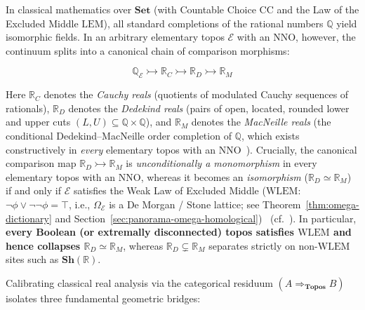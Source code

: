 \documentclass[10pt,twoside,openright]{book}
\theoremstyle{crmplain}
\theoremstyle{crmdef}
\theoremstyle{crmremark}
\begin{document}
In classical mathematics over $\mathbf{Set}$ (with Countable Choice $\mathrm{CC}$ and the Law of the Excluded Middle $\mathrm{LEM}$), all standard completions of the rational numbers $\mathbb{Q}$ yield isomorphic fields. In an arbitrary elementary topos $\mathcal{E}$ with an $\mathrm{NNO}$, however, the continuum splits into a canonical chain of comparison morphisms:

\[
  \mathbb{Q}_{\mathcal{E}} \rightarrowtail \mathbb{R}_C \rightarrowtail \mathbb{R}_D \rightarrowtail \mathbb{R}_M
\]

Here $\mathbb{R}_C$ denotes the \emph{Cauchy reals} (quotients of modulated Cauchy sequences of rationals), $\mathbb{R}_D$ denotes the \emph{Dedekind reals} (pairs of open, located, rounded lower and upper cuts $(L, U) \subseteq \mathbb{Q} \times \mathbb{Q}$), and $\mathbb{R}_M$ denotes the \emph{MacNeille reals} (the conditional Dedekind--MacNeille order completion of $\mathbb{Q}$, which exists constructively in \emph{every} elementary topos with an $\mathrm{NNO}$~\cite[\S D4.7, Thm.~D4.7.6]{Johnstone02}). Crucially, the canonical comparison map $\mathbb{R}_D \rightarrowtail \mathbb{R}_M$ is \emph{unconditionally a monomorphism} in every elementary topos with an $\mathrm{NNO}$, whereas it becomes an \emph{isomorphism} ($\mathbb{R}_D \simeq \mathbb{R}_M$) if and only if $\mathcal{E}$ satisfies the Weak Law of Excluded Middle ($\mathrm{WLEM}$: $\neg\phi \vee \neg\neg\phi = \top$, i.e., $\Omega_{\mathcal{E}}$ is a De Morgan / Stone lattice; see Theorem~\ref{thm:omega-dictionary} and Section~\ref{sec:panorama-omega-homological})~\cite[\S D4.7, Thms.~D4.7.4--D4.7.9]{Johnstone02} (cf.~\cite[Ch.~III]{Johnstone82}). In particular, \textbf{every Boolean (or extremally disconnected) topos satisfies $\mathrm{WLEM}$ and hence collapses $\mathbb{R}_D \simeq \mathbb{R}_M$}, whereas $\mathbb{R}_D \subsetneq \mathbb{R}_M$ separates strictly on non-$\mathrm{WLEM}$ sites such as $\mathbf{Sh}(\mathbb{R})$.

Calibrating classical real analysis via the categorical residuum $(A \Rightarrow_{\mathbf{Topos}} B)$ isolates three fundamental geometric bridges:
\end{document}
